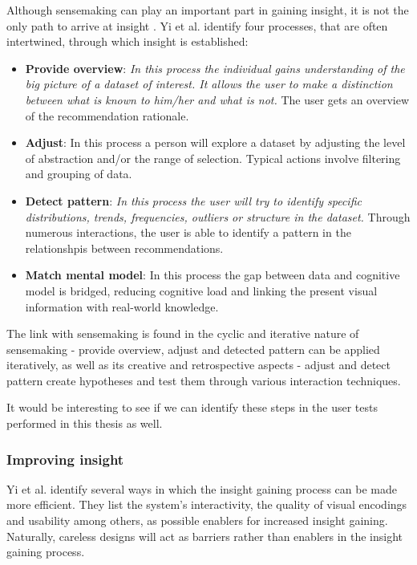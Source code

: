 Although sensemaking can play an important part in gaining insight, it is not the only path to arrive at insight \cite{yi:2008}. Yi et al. \cite{yi:2008} identify four processes, that are often intertwined, through which insight is established:

\begin{itemize}
	\item \textbf{Provide overview}: \textit{In this process the individual gains understanding of the big picture of a dataset of interest. It allows the user to make a distinction between what is known to him/her and what is not.} The user gets an overview of the recommendation rationale.
	\item \textbf{Adjust}: In this process a person will explore a dataset by adjusting the level of abstraction and/or the range of selection. Typical actions involve filtering and grouping of data.
	\item \textbf{Detect pattern}: \textit{In this process the user will try to identify specific distributions, trends, frequencies, outliers or structure in the dataset.} Through numerous interactions, the user is able to identify a pattern in the relationshpis between recommendations.
	\item \textbf{Match mental model}: In this process the gap between data and cognitive model is bridged, reducing cognitive load and linking the present visual information with real-world knowledge.
\end{itemize}

The link with sensemaking is found in the cyclic and iterative nature of sensemaking - provide overview, adjust and detected pattern can be applied iteratively, as well as its creative and retrospective aspects - adjust and detect pattern create hypotheses and test them through various interaction techniques\cite{yi:2008}.

It would be interesting to see if we can identify these steps in the user tests performed in this thesis as well.


\subsubsection{Improving insight}\label{chapter:literature_study:section:user:subsection:insight:subsubsection:improving}


Yi et al. \cite{yi:2008} identify several ways in which the insight gaining process can be made more efficient. They list the system's interactivity, the quality of visual encodings and usability among others, as possible enablers for increased insight gaining. Naturally, careless designs will act as barriers rather than enablers in the insight gaining process.

